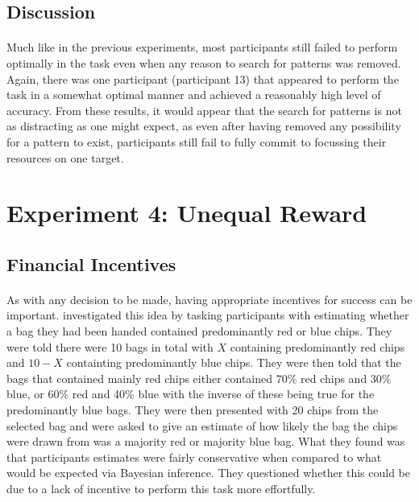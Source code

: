 \documentclass[12pt]{article}
\begin{document}
\subsection*{Discussion}
\paragraph{} Much like in the previous experiments, most participants still failed to perform optimally in the task even when any reason to search for patterns was removed. Again, there was one participant (participant 13) that appeared to perform the task in a somewhat optimal manner and achieved a reasonably high level of accuracy. From these results, it would appear that the search for patterns is not as distracting as one might expect, as even after having removed any possibility for a pattern to exist, participants still fail to fully commit to focussing their resources on one target.


\section*{Experiment 4: Unequal Reward}

\subsection*{Financial Incentives}

\paragraph{} As with any decision to be made, having appropriate incentives for success can be important. \cite{phillips1966conservatism} investigated this idea by tasking participants with estimating whether a bag they had been handed contained predominantly red or blue chips. They were told there were 10 bags in total with $X$ containing predominantly red chips and $10 - X$ containting predominantly blue chips. They were then told that the bags that contained mainly red chips either contained 70\% red chips and 30\% blue, or 60\% red and 40\% blue with the inverse of these being true for the predominantly blue bags. They were then presented with 20 chips from the selected bag and were asked to give an estimate of how likely the bag the chips were drawn from was a majority red or majority blue bag. What they found was that participants estimates were fairly conservative when compared to what would be expected via Bayesian inference. They questioned whether this could be due to a lack of incentive to perform this task more effortfully. 
\end{document}
